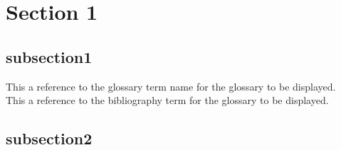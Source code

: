 \section{Section 1}

\subsection{subsection1}

This a reference to the glossary term \gls{name} for the glossary to be displayed.\\

\noindent
This a reference to the bibliography term\cite{doe2024ml} for the glossary to be displayed.


\subsection{subsection2}




\clearpage  %